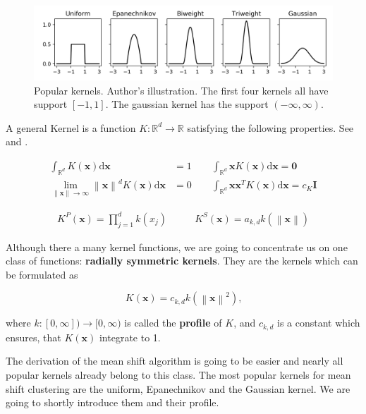 \documentclass{article}
\newcommand{\norm}[1]{\left\lVert#1\right\rVert}
\begin{document}

\begin{figure}
	\centering
	\includegraphics[width=\textwidth]{figures/kde-popular-kernels}
	\caption[Popular kernels]{Popular kernels. Author's illustration. The first four kernels all have support $[-1, 1]$. The gaussian kernel has the support $(-\infty, \infty)$.}
	\label{fig:kde-popular-kernels}
\end{figure}

A general Kernel is a function $K : \mathbb{R}^d \rightarrow \mathbb{R}$ satisfying the following properties. See \citep{Comaniciu.2002} and \citep[p.~95]{Wand.1995}.

\begin{align*}
	\int_{\mathbb{R}^d} K(\bm{x})\mathrm{d}\bm{x} &= 1 \qquad \int_{\mathbb{R}^d} \bm{x} K(\bm{x})\mathrm{d}\bm{x} = \bm{0} \\
	\lim_{\norm{\bm{x}} \rightarrow \infty}  \norm{\bm{x}}^d K(\bm{x})\mathrm{d}\bm{x} &= 0 \qquad \int_{\mathbb{R}^d} \bm{x} \bm{x}^T K(\bm{x})\mathrm{d}\bm{x} = c_K \bm{I}
\end{align*}

\begin{align*}
	K^P(\bm{x}) = \prod_{j=1}^d k(x_j) & \qquad
	K^S(\bm{x}) = a_{k,d} k(\norm{\bm{x}})
\end{align*}

Although there a many kernel functions, we are going to concentrate us on one class of functions: \textbf{radially symmetric kernels}. They are the kernels which can be formulated as

\begin{equation}
	K(\bm{x}) = c_{k,d} k(\norm{\bm{x}}^2)\text{,}
\end{equation}

where $k : [0, \infty]) \rightarrow [0, \infty)$ is called the \textbf{profile} of $K$, and $c_{k,d}$ is a constant which ensures, that $K(\bm{x})$ integrate to 1.

The derivation of the mean shift algorithm is going to be easier and nearly all popular kernels already belong to this class. The most popular kernels for mean shift clustering are the uniform, Epanechnikov and the Gaussian kernel. We are going to shortly introduce them and their profile.
\end{document}
